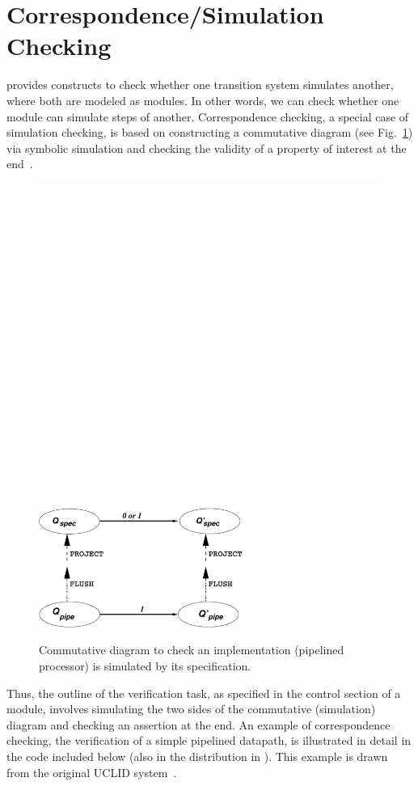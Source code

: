 \section{Correspondence/Simulation Checking}

\uclid{} provides constructs to check whether one transition system
simulates another, where both are
modeled as \uclid{} modules. In other words, we can check
whether one module can simulate steps of another.
Correspondence checking, a special case of simulation checking,
is based on constructing a commutative diagram (see Fig.~\ref{fig:comm-diag}) via symbolic simulation and checking the validity of a property
of interest at the end~\cite{burch-cav94}. 

\begin{figure}[htbp]
\centering
\includegraphics[width=0.7 \columnwidth]{figures/correspond.pdf}
   \label{fig:comm-diag}
	\caption{Commutative diagram to check an implementation (pipelined processor) is simulated by its specification.}
\end{figure}

Thus, the outline of the verification task, as
specified in the control section of a module,
involves simulating the two sides of the commutative (simulation)
diagram and checking an assertion at the end.
An example of correspondence checking, the verification of a simple
pipelined datapath,
is illustrated in detail in the code included below
(also in the distribution in ).
This example is drawn from the original UCLID system~\cite{DBLP:conf/cav/LahiriS04,bryant-cav02}.

